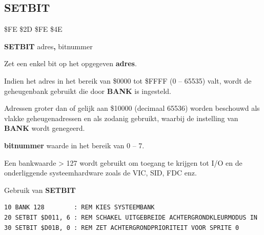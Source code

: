 
\newpage
\subsection{SETBIT}
\begin{description}[leftmargin=2cm,style=nextline]
\item [Token:]    \$FE \$2D \$FE \$4E

\item [Formaat:]   {\bf SETBIT} adres{\bf,} bitnummer

\item [Gebruik:]    Zet een enkel bit op het opgegeven {\bf adres}.

Indien het adres in het bereik van \$0000 tot \$FFFF (0 -- 65535) valt, wordt de geheugenbank gebruikt die door {\bf BANK} is ingesteld.

                  Adressen groter dan of gelijk aan \$10000 (decimaal 65536) worden beschouwd als vlakke geheugenadressen en als zodanig gebruikt, waarbij de instelling van {\bf BANK} wordt genegeerd.

                  {\bf bitnummer} waarde in het bereik van 0 -- 7.

                  Een bankwaarde > 127 wordt gebruikt om toegang te krijgen tot I/O en de onderliggende systeemhardware zoals de VIC, SID, FDC enz.

\item [Voorbeeld:]  Gebruik van {\bf SETBIT}

\begin{tcolorbox}[colback=black,coltext=white]
\verbatimfont{\codefont}
\begin{verbatim}
10 BANK 128        : REM KIES SYSTEEMBANK
20 SETBIT $D011, 6 : REM SCHAKEL UITGEBREIDE ACHTERGRONDKLEURMODUS IN
30 SETBIT $D01B, 0 : REM ZET ACHTERGRONDPRIORITEIT VOOR SPRITE 0
\end{verbatim}
\end{tcolorbox}
\end{description}


\newpage
